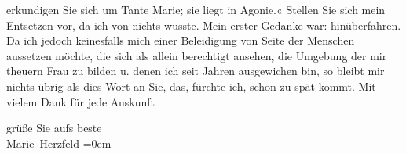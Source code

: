                erkundigen Sie sich um Tante Marie; sie liegt
               in Agonie.« Stellen Sie sich mein Entsetzen vor, da ich von nichts wusste. Mein
               erster Gedanke war: hinüberfahren. Da ich {\pb}jedoch
               keinesfalls mich einer Beleidigung von Seite der Menschen aussetzen möchte, die sich
               als allein berechtigt ansehen, die Umgebung der mir theuern Frau zu bilden u. denen ich seit Jahren
               ausgewichen bin, so bleibt mir nichts übrig als dies Wort an Sie, das, fürchte ich,
               schon zu spät kommt. Mit vielem Dank für jede Auskunft\pend
           
\pstart
           grüße Sie aufs beste {\\[\baselineskip]}\spacefill\mbox{Marie Herzfeld}\pend
           \leftskip=0em{}\endnumbering{}  
      